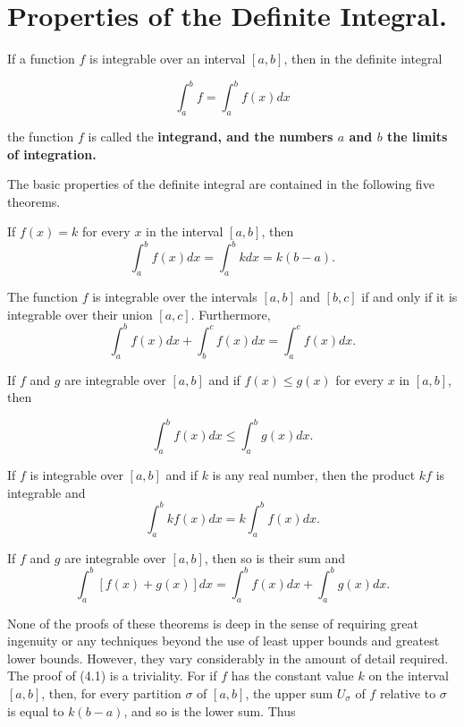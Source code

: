 \section{Properties of the Definite Integral.}\label{sec 4.4}
If a function $f$ is integrable over an interval $[a, b]$, then in the definite integral 

$$
\int_{a}^{b} f = \int_{a}^{b} f(x) dx
$$

\noindent the function $f$ is called the \bf{integrand}, \rm{and the numbers $a$ and $b$ the} \bf{limits of integration}.

\rm{The basic properties of the definite integral are contained in the following five theorems.}

 
\begin{theorem} %
If $f (x) = k$ for every $x$ in the interval $[a, b]$, then 
$$
\int_{a}^{b} f(x) dx = \int_{a}^{b} k dx = k(b - a).
$$
\end{theorem}

\begin{theorem} %
The function $f$ is integrable over the intervals $[a, b]$ and $[b, c]$ if and only if it is integrable over their union $[a, c]$. Furthermore,
$$
\int_{a}^{b} f(x) dx + \int_{b}^{c} f(x) dx = \int_{a}^{c} f(x) dx.
$$
\end{theorem}

\begin{theorem} %
\label{thm 4.4.3}
If $f$ and $g$ are integrable over $[a, b]$ and if $f (x) \leq g(x)$ for every $x$ in $[a, b]$, then

$$
\int_{a}^{b} f(x)dx \leq  \int_{a}^{b} g(x)dx.
$$
\end{theorem}

\begin{theorem} %
\label{thm 4.4.4}
If $f$ is integrable over $[a, b]$ and if $k$ is any real number, then the product $kf$ is integrable and
$$
\int_{a}^{b} k f (x) dx = k \int_{a}^{b} f (x) dx.
$$
\end{theorem}

 
\begin{theorem} %
If $f$ and $g$ are integrable over $[a, b]$, then so is their sum and
$$
\int_{a}^{b} [f(x) + g(x)] dx = \int_{a}^{b} f(x) dx + \int_{a}^{b} g(x) dx.
$$
\end{theorem}

None of the proofs of these theorems is deep in the sense of requiring great ingenuity or any techniques beyond the use of least upper bounds and greatest lower bounds. However, they vary considerably in the amount of detail required. The proof of (4.1) is a triviality. For if $f$ has the constant value $k$ on the interval $[a, b]$, then, for every partition $\sigma$ of $[a, b]$, the upper sum $U_{\sigma}$ of $f$ relative to $\sigma$ is equal to $k(b - a)$, and so is the lower sum. Thus


